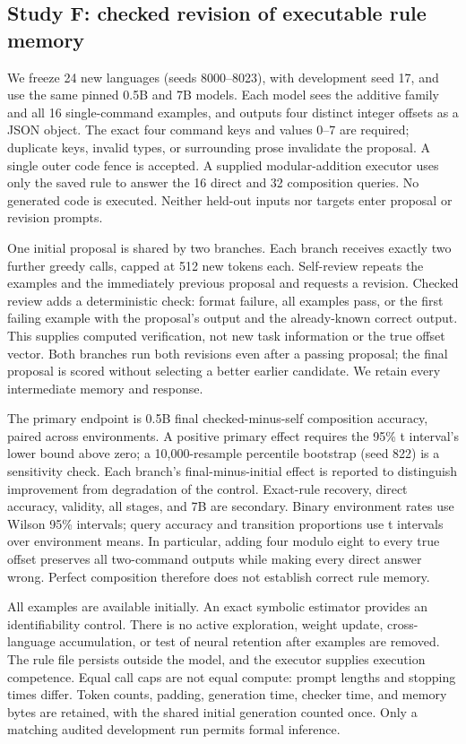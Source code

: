 \documentclass[11pt]{article}
\begin{document}
\subsection{Study F: checked revision of executable rule memory}
We freeze 24 new languages (seeds 8000--8023), with development seed 17,
and use the same pinned 0.5B and 7B models. Each model sees the additive
family and all 16 single-command examples, and outputs four distinct integer
offsets as a JSON object. The exact four command keys and values 0--7 are
required; duplicate keys, invalid types, or surrounding prose invalidate the
proposal. A single outer code fence is accepted. A supplied modular-addition
executor uses only the saved rule to answer the 16 direct and 32 composition
queries. No generated code is executed. Neither held-out inputs nor targets
enter proposal or revision prompts.

One initial proposal is shared by two branches. Each branch receives exactly
two further greedy calls, capped at 512 new tokens each. Self-review repeats
the examples and the immediately previous proposal and requests a revision.
Checked review adds a deterministic check: format failure, all examples pass,
or the first failing example with the proposal's output and the already-known
correct output. This supplies computed verification, not new task information
or the true offset vector. Both branches run both revisions even after a
passing proposal; the final proposal is scored without selecting a better
earlier candidate. We retain every intermediate memory and response.

The primary endpoint is 0.5B final checked-minus-self composition accuracy,
paired across environments. A positive primary effect requires the 95\% t
interval's lower bound above zero; a 10,000-resample percentile bootstrap
(seed 822) is a sensitivity check. Each branch's final-minus-initial effect
is reported to distinguish improvement from degradation of the control.
Exact-rule recovery, direct accuracy, validity, all stages, and 7B are
secondary. Binary environment rates use Wilson 95\% intervals; query accuracy
and transition proportions use t intervals over environment means. In
particular, adding four modulo eight to every true offset
preserves all two-command outputs while making every direct answer wrong.
Perfect composition therefore does not establish correct rule memory.

All examples are available initially. An exact symbolic estimator provides
an identifiability control. There is no active exploration, weight update,
cross-language accumulation, or test of neural retention after examples are
removed. The rule file persists outside the model, and the executor supplies
execution competence. Equal call caps are not equal compute: prompt lengths
and stopping times differ. Token counts, padding, generation time, checker
time, and memory bytes are retained, with the shared initial generation
counted once. Only a matching audited development run permits formal inference.
\end{document}
